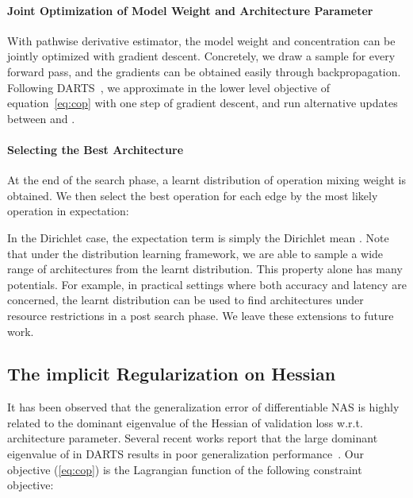 \documentclass{article} \usepackage{iclr2021_conference,times}
\def\eqref#1{equation~\ref{#1}}
\begin{document}
\paragraph{Joint Optimization of Model Weight and Architecture Parameter}
With pathwise derivative estimator, the model weight  and concentration  can be jointly optimized with gradient descent.
Concretely, we draw a sample   for every forward pass, and the gradients can be obtained easily through backpropagation.
Following DARTS~\citep{darts}, we approximate  in the lower level objective of \eqref{eq:cop} with one step of gradient descent, and run alternative updates between  and .

\paragraph{Selecting the Best Architecture}
At the end of the search phase, a learnt distribution of operation mixing weight is obtained.
We then select the best operation for each edge by the most likely operation in expectation:

In the Dirichlet case, the expectation term is simply the Dirichlet mean .
Note that under the distribution learning framework, we are able to sample a wide range of architectures from the learnt distribution.
This property alone has many potentials.
For example, in practical settings where both accuracy and latency are concerned, the learnt distribution can be used to find architectures under resource restrictions in a post search phase.
We leave these extensions to future work. 

\subsection{The implicit Regularization on Hessian}
\label{subsec:hessian}
It has been observed that the generalization error of differentiable NAS is highly related to the dominant eigenvalue of the Hessian of validation loss w.r.t. architecture parameter.
Several recent works report that the large dominant eigenvalue of  in DARTS results in poor generalization performance~\citep{understanding,smoothdarts}.
Our objective (\ref{eq:cop}) is the Lagrangian function of the following constraint objective:
\end{document}
